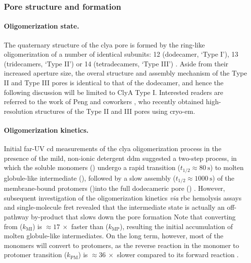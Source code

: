 \subsubsection{Pore structure and formation}

\paragraph{Oligomerization state.}
%
The quaternary structure of the \gls{clya} pore is formed by the ring-like oligomerization of a number of
identical subunits: 12 (dodecamer, `Type I'), 13 (tridecamers, `Type II') or 14 (tetradecamers, `Type
III') \cite{Soskine-2013}. Aside from their increased aperture size, the overal structure and assembly
mechanism of the Type II and Type III pores is identical to that of the dodecamer, and hence the following
discussion will be limited to ClyA Type I. Interested readers are referred to the work of Peng and
coworkers \cite{Peng-2019}, who recently obtained high-resolution structures of the Type II and III pores using
\gls{cryo-em}.

\paragraph{Oligomerization kinetics.}
%
Initial far-UV \gls{cd} measurements of the \gls{clya} oligomerization process in the presence of the mild,
non-ionic detergent \gls{ddm} suggested a two-step process, in which the soluble monomers () undergo a
rapid transition ($t_{1/2} \approx \SI{80}{\second}$) to molten globule-like intermediate (), followed
by a slow assembly  ($t_{1/2} \approx \SI{1000}{\second}$) of the membrane-bound protomers ()into the
full dodecameric pore () \cite{Eifler-2006}. However, subsequent investigation of the oligomerization
kinetics \textit{via} \gls{rbc} hemolysis assays \cite{Vaidyanathan-2014} and single-molecule
\gls{fret} \cite{Benke-2015} revealed that the intermediate state is actually an off-pathway by-product that
slows down the pore formation \cite{Roderer-2017}
%
%
Note that converting from  ($k_{\text{MI}}$) is $\approx17~\times$ faster than 
($k_{\text{MP}}$), resulting the initial accumulation of molten globule-like intermediates. On the long term,
however, most of the monomers will convert to protomers, as the reverse reaction in the monomer to protomer
transition  ($k_{\text{PM}}$) is $\approx36~\times$ slower compared to its forward reaction
.

